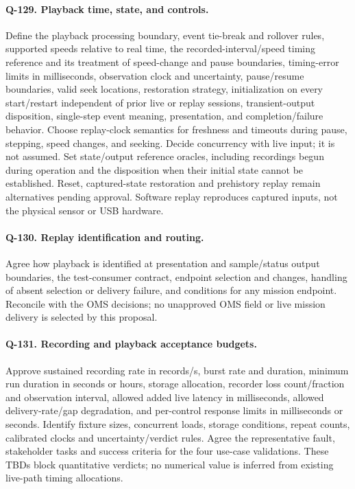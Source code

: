 \paragraph{Q-129. Playback time, state, and controls.}\label{Question:Q-129}
Define the playback processing boundary, event tie-break and rollover rules, supported speeds relative to real time, the recorded-interval/speed timing reference and its treatment of speed-change and pause boundaries, timing-error limits in milliseconds, observation clock and uncertainty, pause/resume boundaries, valid seek locations, restoration strategy, initialization on every start/restart independent of prior live or replay sessions, transient-output disposition, single-step event meaning, presentation, and completion/failure behavior. Choose replay-clock semantics for freshness and timeouts during pause, stepping, speed changes, and seeking. Decide concurrency with live input; it is not assumed. Set state/output reference oracles, including recordings begun during operation and the disposition when their initial state cannot be established. Reset, captured-state restoration and prehistory replay remain alternatives pending approval. Software replay reproduces captured inputs, not the physical sensor or USB hardware.

\paragraph{Q-130. Replay identification and routing.}\label{Question:Q-130}
Agree how playback is identified at presentation and sample/status output boundaries, the test-consumer contract, endpoint selection and changes, handling of absent selection or delivery failure, and conditions for any mission endpoint. Reconcile with the OMS decisions; no unapproved OMS field or live mission delivery is selected by this proposal.

\paragraph{Q-131. Recording and playback acceptance budgets.}\label{Question:Q-131}
Approve sustained recording rate in records/s, burst rate and duration, minimum run duration in seconds or hours, storage allocation, recorder loss count/fraction and observation interval, allowed added live latency in milliseconds, allowed delivery-rate/gap degradation, and per-control response limits in milliseconds or seconds. Identify fixture sizes, concurrent loads, storage conditions, repeat counts, calibrated clocks and uncertainty/verdict rules. Agree the representative fault, stakeholder tasks and success criteria for the four use-case validations. These TBDs block quantitative verdicts; no numerical value is inferred from existing live-path timing allocations.

